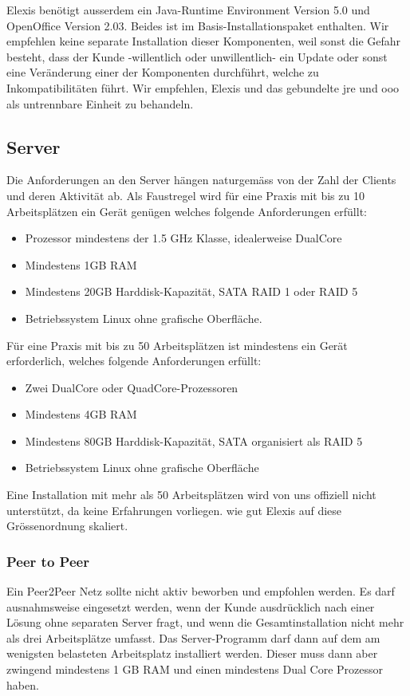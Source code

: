 \documentclass[paper=a4,BCOR8.25mm,twoside]{scrartcl}
\begin{document}
\bigskip
Elexis benötigt ausserdem ein Java-Runtime Environment Version 5.0 und OpenOffice Version 2.03. Beides ist im Basis-Installationspaket enthalten. Wir empfehlen keine separate Installation dieser Komponenten, weil sonst die Gefahr besteht, dass der Kunde -willentlich oder unwillentlich- ein Update oder sonst eine Veränderung einer der Komponenten durchführt, welche zu Inkompatibilitäten führt. Wir empfehlen, Elexis und das gebundelte jre und ooo als untrennbare Einheit zu behandeln.

\subsection{Server}
Die Anforderungen an den Server hängen naturgemäss von der Zahl der Clients und deren Aktivität ab. Als Faustregel wird für eine Praxis mit bis zu 10 Arbeitsplätzen ein Gerät genügen welches folgende Anforderungen erfüllt:
\begin{itemize}
    \item Prozessor mindestens der 1.5 GHz Klasse, idealerweise DualCore
    \item Mindestens 1GB RAM
    \item Mindestens 20GB Harddisk-Kapazität, SATA RAID 1 oder RAID 5
    \item Betriebssystem Linux ohne grafische Oberfläche.
\end{itemize}

Für eine Praxis mit bis zu 50 Arbeitsplätzen ist mindestens ein Gerät erforderlich, welches folgende Anforderungen erfüllt:
\begin{itemize}
    \item Zwei DualCore oder QuadCore-Prozessoren
    \item Mindestens 4GB RAM
    \item Mindestens 80GB Harddisk-Kapazität, SATA organisiert als RAID 5
    \item Betriebssystem Linux ohne grafische Oberfläche
\end{itemize}

Eine Installation mit mehr als 50 Arbeitsplätzen wird von uns offiziell nicht unterstützt, da keine Erfahrungen vorliegen. wie gut Elexis auf diese Grössenordnung skaliert.

\subsubsection{Peer to Peer}
Ein Peer2Peer Netz sollte nicht aktiv beworben und empfohlen werden. Es darf ausnahmsweise eingesetzt werden, wenn der Kunde ausdrücklich nach einer Lösung ohne separaten Server fragt, und wenn die Gesamtinstallation nicht mehr als drei Arbeitsplätze umfasst. Das Server-Programm darf dann auf dem am wenigsten belasteten Arbeitsplatz installiert werden. Dieser muss dann aber zwingend mindestens 1 GB RAM und einen mindestens Dual Core Prozessor haben.
\end{document}
